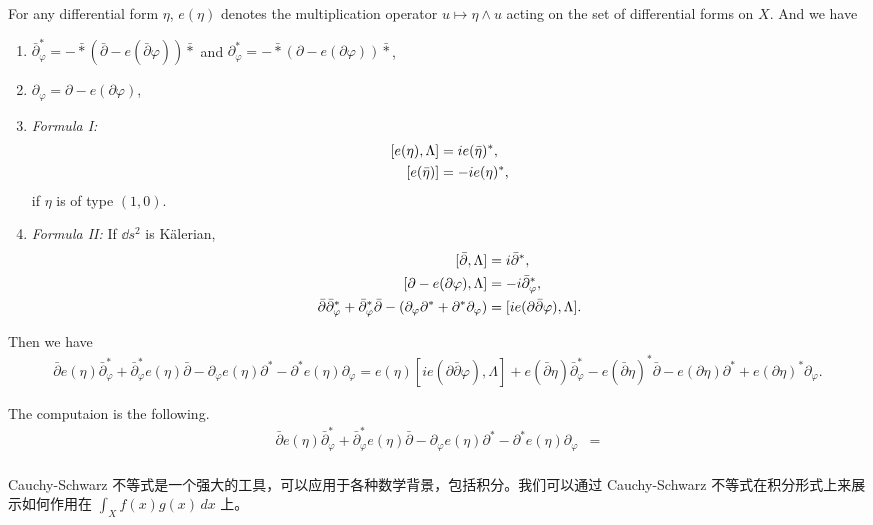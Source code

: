 \documentclass[lang=cn,zihao=-4,a4paper,fontset=none]{beautybook}
\begin{document}
For any differential form $\eta$, $e(\eta)$ denotes the multiplication operator $u\mapsto \eta\wedge u$ acting on the set of differential forms on $X$. And we have
\begin{enumerate}
    \item $\bar\partial^*_\varphi=-\bar*(\bar\partial-e(\bar\partial\varphi))\bar*$ and $\partial^*_\varphi=-\bar*(\partial-e(\partial\varphi))\bar*$,
    \item $\partial_\varphi=\partial-e(\partial\varphi)$,
    \item \emph{Formula I:} 
    \[\begin{aligned}
        \relax[e(\eta),\Lambda]&=ie(\bar\eta)^*,\\ 
        [e(\bar\eta)] &=-ie(\eta)^*,
    \end{aligned}\]
    if $\eta$ is of type $(1,0)$.
    \item \emph{Formula II:} If $\dd s^2$ is K\"alerian, 
    \[
        \begin{aligned}
            \relax[\bar\partial,\Lambda] &=i\bar\partial^*,\\ 
            [\partial-e(\partial\varphi),\Lambda] &=-i\bar\partial^*_\varphi,\\ 
            \bar\partial\bar\partial^*_\varphi+\bar\partial^*_\varphi\bar\partial-(\partial_\varphi\partial^*+\partial^*\partial_\varphi) &=[ie(\partial\bar\partial\varphi),\Lambda].
        \end{aligned}
    \]
\end{enumerate}

Then we have 
\begin{align*}
    \bar\partial e(\eta) \bar\partial^*_\varphi+\bar\partial^*_\varphi e(\eta)\bar\partial-\partial_\varphi e(\eta) \partial^*-\partial^* e(\eta)\partial_\varphi=e(\eta) [ie(\partial\bar\partial\varphi),\Lambda]+e(\bar\partial\eta)\bar\partial^*_\varphi-e(\bar\partial\eta)^* \bar\partial-e(\partial \eta)\partial^*+e(\partial\eta)^*\partial_\varphi.
\end{align*}
    
The computaion is the following. 
\begin{align*}
    \bar\partial e(\eta) \bar\partial^*_\varphi+\bar\partial^*_\varphi e(\eta)\bar\partial-\partial_\varphi e(\eta) \partial^*-\partial^* e(\eta)\partial_\varphi 
    &=\\
\end{align*}
    
Cauchy-Schwarz 不等式是一个强大的工具，可以应用于各种数学背景，包括积分。我们可以通过 Cauchy-Schwarz 不等式在积分形式上来展示如何作用在 $\int_X f(x)g(x) \, dx$ 上。
\end{document}
